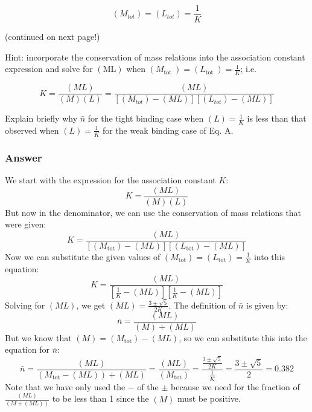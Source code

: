 \documentclass[12pt]{article}
\begin{document}
$$
\left(M_{t o t}\right)=\left(L_{t o t}\right)=\frac{1}{K}
$$

(continued on next page!)

Hint: incorporate the conservation of mass relations into the association constant expression and solve for $(\mathrm{ML})$ when $\left(M_{\text {tot }}\right)=\left(L_{\text {tot }}\right)=\frac{1}{K}$; i.e.

$$
K=\frac{(M L)}{(M)(L)}=\frac{(M L)}{\left[\left(M_{t o t}\right)-(M L)\right]\left[\left(L_{t o t}\right)-(M L)\right]}
$$

Explain briefly why $\bar{n}$ for the tight binding case when $(L)=\frac{1}{K}$ is less than that observed when $(L)=\frac{1}{K}$ for the weak binding case of Eq. A.
\subsubsection{Answer}
We start with the expression for the association constant $K$:
\begin{equation}
K=\frac{(M L)}{(M)(L)}
\end{equation}
But now in the denominator, we can use the conservation of mass relations that were given:
\begin{equation}
K=\frac{(M L)}{\left[\left(M_{\text{tot}}\right)-(M L)\right]\left[\left(L_{\text{tot}}\right)-(M L)\right]}
\end{equation}
Now we can substitute the given values of $\left(M_{\text{tot}}\right)=\left(L_{\text{tot}}\right)=\frac{1}{K}$ into this equation:
\begin{equation}
K=\frac{(M L)}{\left[\frac{1}{K}-(M L)\right]\left[\frac{1}{K}-(M L)\right]}
\end{equation}
Solving for $(M L)$, we get $(M L)=\frac{3\pm\sqrt{5}}{2K}$. The definition of $\bar{n}$ is given by:
\begin{equation}
\bar{n}=\frac{(M L)}{(M)+(M L)}
\end{equation}
But we know that $(M) = (M_{\text{tot}}) - (M L)$, so we can substitute this into the equation for $\bar{n}$:
\begin{equation}
\bar{n}=\frac{(M L)}{(M_{\text{tot}} - (M L)) + (M L)}=\frac{(M L)}{(M_{\text{tot}})}=\frac{\frac{3\pm\sqrt{5}}{2K}}{\frac{1}{K}}=\frac{3\pm\sqrt{5}}{2}= 0.382
\end{equation}
Note that we have only used the $-$ of the $\pm$ because we need for the fraction of $\frac{(M L)}{(M+(M L))}$ to be less than 1 since the $(M)$ must be positive.
\end{document}
